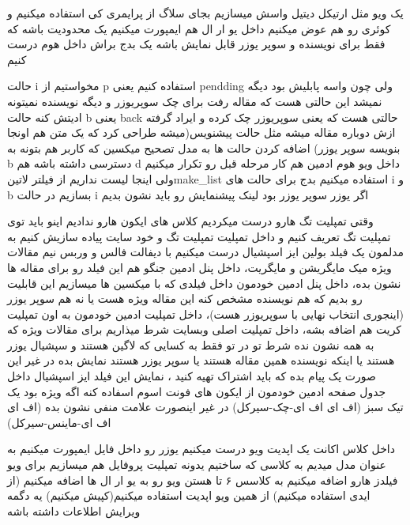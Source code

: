 \documentclass{article}
\begin{document}
			 یک ویو مثل ارتیکل دیتیل واسش میسازیم بجای سلاگ از پرایمری کی استفاده میکنیم و کوئری رو هم عوض میکنیم
			 داخل یو ار ال هم ایمپورت میکنیم
			 یک محدودیت باشه که فقط برای نویسنده و سوپر یوزر قابل نمایش باشه
			 یک بدج براش داخل هوم درست کنیم
			
	
		حالت i مخواستیم از p استفاده کنیم یعنی pendding ولی چون واسه پابلیش بود دیگه نمیشد این حالتی هست که مقاله رفت برای چک سوپریوزر
		و دیگه نویسنده نمیتونه ادیتش کنه حالت b یعنی back حالتی هست که یعنی سوپریوزر چک کرده و ایراد گرفته ازش دوباره مقاله میشه مثل حالت
		پیشنویس(میشه طراحی کرد که یک متن هم اونجا بنویسه سوپر یوزر)
			 اضافه کردن حالت ها به مدل
			 تصحیح میکسین که کاربر هم بتونه به b دسترسی داشته باشه هم d 
			 داخل ویو هوم ادمین هم کار مرحله قبل رو تکرار میکنیم ولی اینجا لیست نداریم از فیلتر ‌لاتین{make\_list} استفاده میکنیم
			 بدج برای حالت های i و b بسازیم 
			 در حالت i اگر یوزر سوپر یوزر بود لینک پیشنمایش رو باید نشون بدیم
		
		 وقتی تمپلیت تگ هارو درست میکردیم کلاس های ایکون هارو ندادیم اینو باید توی تمپلیت تگ تعریف کنیم و داخل تمپلیت
		تمپلیت تگ و خود سایت پیاده سازیش کنیم
			به مدلمون یک فیلد بولین ایز اسپشیال درست میکنیم با دیفالت فالس و وربس نیم مقالات ویژه میک مایگریشن و مایگریت، داخل پنل ادمین
			جنگو هم این فیلد رو برای مقاله ها نشون بده، داخل پنل ادمین خودمون داخل فیلدی که با میکسین ها میسازیم این قابلیت رو بدیم 
			که هم نویسنده مشخص کنه این مقاله ویژه هست یا نه هم سوپر یوزر (اینجوری انتخاب نهایی با سوپریوزر هست)، داخل تمپلیت ادمین
			خودمون به اون تمپلیت کریت هم اضافه بشه، داخل تمپلیت اصلی وبسایت شرط میذاریم برای مقالات ویژه که به همه نشون نده
			شرط تو در تو فقط به کسایی که لاگین هستند و سپشیال یوزر هستند یا اینکه نویسنده همین مقاله هستند یا سوپر یوزر هستند نمایش بده 
			در غیر این صورت یک پیام بده که باید اشتراک تهیه کنید ، نمایش این فیلد ایز اسپشیال داخل جدول صفحه ادمین خودمون از ایکون های 
			فونت اسوم اسفاده کنه اگه ویژه بود یک تیک سبز (اف ای اف ای-چک-سیرکل) در غیر اینصورت علامت منفی نشون بده 
			(اف ای اف ای-ماینس-سیرکل)
			
			 داخل کلاس اکانت یک اپدیت ویو درست میکنیم
			 یوزر رو داخل فایل ایمپورت میکنیم به عنوان مدل میدیم به کلاسی که ساختیم یدونه تمپلیت پروفایل هم میسازیم برای ویو
			 فیلدز هارو اضافه میکنیم به کلاسس ۶ تا هستن
			 ویو رو به یو ار ال ها اضافه میکنیم (از ایدی استفاده میکنیم)
			 از همین ویو اپدیت استفاده میکنیم(کپیش میکنیم) یه دگمه ویرایش اطلاعات داشته باشه
			
\end{document}
